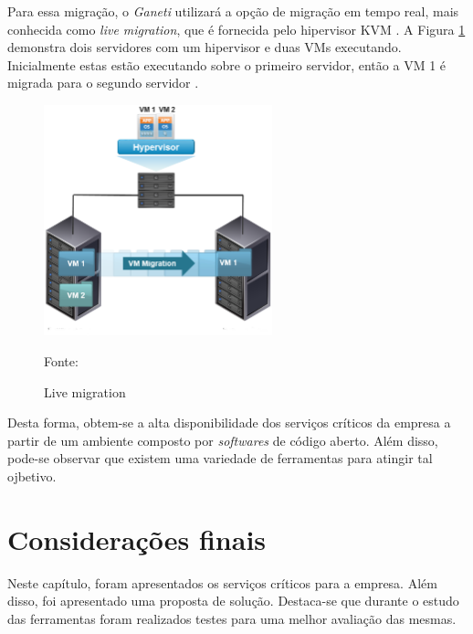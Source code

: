 Para essa migração, o \textit{Ganeti} utilizará a opção de migração em tempo real, mais conhecida como \textit{live migration}, que é fornecida 
pelo hipervisor \ac{KVM} \cite{kvm}. A Figura \ref{fig:vms_migration} demonstra dois servidores com um hipervisor e duas \ac{VM}s executando. 
Inicialmente estas estão executando sobre o primeiro servidor, então a \ac{VM} 1 é migrada para o segundo servidor \cite{livemigration}.

\begin{figure}[h!]
 \centering
 \includegraphics[width=250px]{img/vms_migration.eps}
 \caption{Live migration}
 Fonte: \citet{spaniol2015}
 \label{fig:vms_migration}
\end{figure}

Desta forma, obtem-se a alta disponibilidade dos serviços críticos da empresa a partir de um ambiente composto por \textit{softwares} de código 
aberto. Além disso, pode-se observar que existem uma variedade de ferramentas para atingir tal ojbetivo.

% 
% 
% 
% 


\section{Considerações finais}

Neste capítulo, foram apresentados os serviços críticos para a empresa. Além disso, foi apresentado uma proposta de solução. Destaca-se que 
durante o estudo das ferramentas foram realizados testes para uma melhor avaliação das mesmas.

